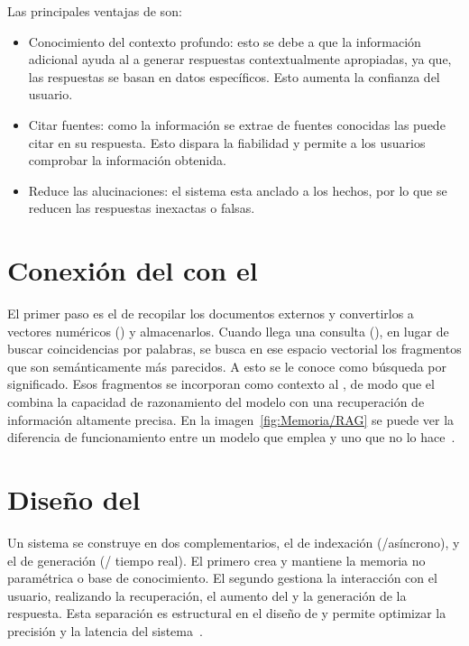 Las principales ventajas de  son:
\begin{itemize}
\tightlist
	\item Conocimiento del contexto profundo: esto se debe a que la información adicional ayuda al  a generar respuestas contextualmente apropiadas, ya que, las respuestas se basan en datos específicos. Esto aumenta la confianza del usuario.
	\item Citar fuentes: como la información se extrae de fuentes conocidas las puede citar en su respuesta. Esto dispara la fiabilidad y permite a los usuarios comprobar la información obtenida.
	\item Reduce las alucinaciones: el sistema esta anclado a los hechos, por lo que se reducen las respuestas inexactas o falsas. 
\end{itemize}

\section{Conexión del  con el }
El primer paso es el de recopilar los documentos externos y convertirlos a vectores numéricos () y almacenarlos. Cuando llega una consulta (), en lugar de buscar coincidencias por palabras, se busca en ese espacio vectorial los fragmentos que son semánticamente más parecidos. A esto se le conoce como búsqueda por significado. Esos fragmentos se incorporan como contexto al , de modo que el  combina la capacidad de razonamiento del modelo con una recuperación de información altamente precisa. En la imagen~\ref{fig:Memoria/RAG} se puede ver la diferencia de funcionamiento entre un modelo que emplea  y uno que no lo hace~\cite{RAG:image}.


\section{Diseño del }
Un sistema  se construye en dos  complementarios, el de indexación (/asíncrono), y el de generación (/ tiempo real). El primero crea y mantiene la memoria no paramétrica o base de conocimiento. El segundo gestiona la interacción con el usuario, realizando la recuperación, el aumento del  y la generación de la respuesta. Esta separación es estructural en el diseño de  y permite optimizar la precisión y la latencia del sistema~\cite{book:RAG_SimpleGuide}.

